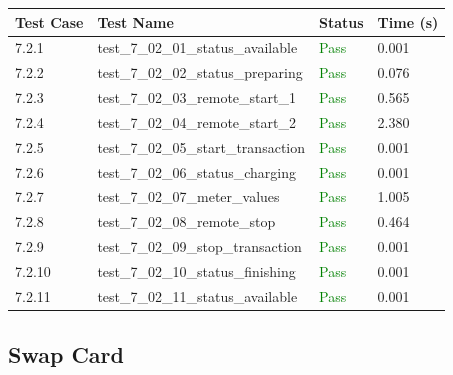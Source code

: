 \documentclass{article}
\begin{document}
\begin{longtable}{p{} p{} p{} p{}}
\toprule
\textbf{Test Case} & \textbf{Test Name} & \textbf{Status} & \textbf{Time (s)} \\
\midrule
\endhead
7.2.1 & test\_7\_02\_01\_status\_available & \textcolor{green}{Pass} & 0.001 \\
7.2.2 & test\_7\_02\_02\_status\_preparing & \textcolor{green}{Pass} & 0.076 \\
7.2.3 & test\_7\_02\_03\_remote\_start\_1 & \textcolor{green}{Pass} & 0.565 \\
7.2.4 & test\_7\_02\_04\_remote\_start\_2 & \textcolor{green}{Pass} & 2.380 \\
7.2.5 & test\_7\_02\_05\_start\_transaction & \textcolor{green}{Pass} & 0.001 \\
7.2.6 & test\_7\_02\_06\_status\_charging & \textcolor{green}{Pass} & 0.001 \\
7.2.7 & test\_7\_02\_07\_meter\_values & \textcolor{green}{Pass} & 1.005 \\
7.2.8 & test\_7\_02\_08\_remote\_stop & \textcolor{green}{Pass} & 0.464 \\
7.2.9 & test\_7\_02\_09\_stop\_transaction & \textcolor{green}{Pass} & 0.001 \\
7.2.10 & test\_7\_02\_10\_status\_finishing & \textcolor{green}{Pass} & 0.001 \\
7.2.11 & test\_7\_02\_11\_status\_available & \textcolor{green}{Pass} & 0.001 \\
\bottomrule
\end{longtable}
\subsection{Swap Card}
\end{document}
